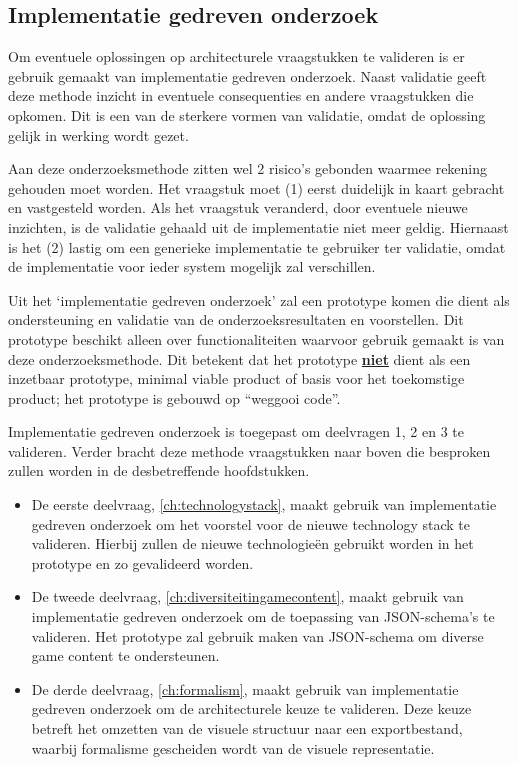 \subsection{Implementatie gedreven onderzoek}
Om eventuele oplossingen op architecturele vraagstukken te valideren is er gebruik gemaakt van implementatie gedreven onderzoek. Naast validatie geeft deze methode inzicht in eventuele consequenties en andere vraagstukken die opkomen. Dit is een van de sterkere vormen van validatie, omdat de oplossing gelijk in werking wordt gezet.

Aan deze onderzoeksmethode zitten wel 2 risico’s gebonden waarmee rekening gehouden moet worden\cite{ResearchSkillsInComputerScience}. Het vraagstuk moet (1) eerst duidelijk in kaart gebracht en vastgesteld worden. Als het vraagstuk veranderd, door eventuele nieuwe inzichten, is de validatie gehaald uit de implementatie niet meer geldig. Hiernaast is het (2) lastig om een generieke implementatie te gebruiker ter validatie, omdat de implementatie voor ieder system mogelijk zal verschillen.

Uit het ‘implementatie gedreven onderzoek’ zal een prototype komen die dient als ondersteuning en validatie van de onderzoeksresultaten en voorstellen. Dit prototype beschikt alleen over functionaliteiten waarvoor gebruik gemaakt is van deze onderzoeksmethode. Dit betekent dat het prototype \underline{\textbf{niet}} dient als een inzetbaar prototype, minimal viable product of basis voor het toekomstige product; het prototype is gebouwd op “weggooi code”.

Implementatie gedreven onderzoek is toegepast om deelvragen 1, 2 en 3 te valideren. Verder bracht deze methode vraagstukken naar boven die besproken zullen worden in de desbetreffende hoofdstukken.

\begin{itemize}
    \item De eerste deelvraag, \autoref{ch:technologystack}, maakt gebruik van implementatie gedreven onderzoek om het voorstel voor de nieuwe technology stack te valideren. Hierbij zullen de nieuwe technologieën gebruikt worden in het prototype en zo gevalideerd worden.
    \item De tweede deelvraag, \autoref{ch:diversiteitingamecontent}, maakt gebruik van implementatie gedreven onderzoek om de toepassing van JSON-schema’s te valideren. Het prototype zal gebruik maken van JSON-schema om diverse game content te ondersteunen.
    \item De derde deelvraag, \autoref{ch:formalism}, maakt gebruik van implementatie gedreven onderzoek om de architecturele keuze te valideren. Deze keuze betreft het omzetten van de visuele structuur naar een exportbestand, waarbij formalisme gescheiden wordt van de visuele representatie.
\end{itemize}
    
